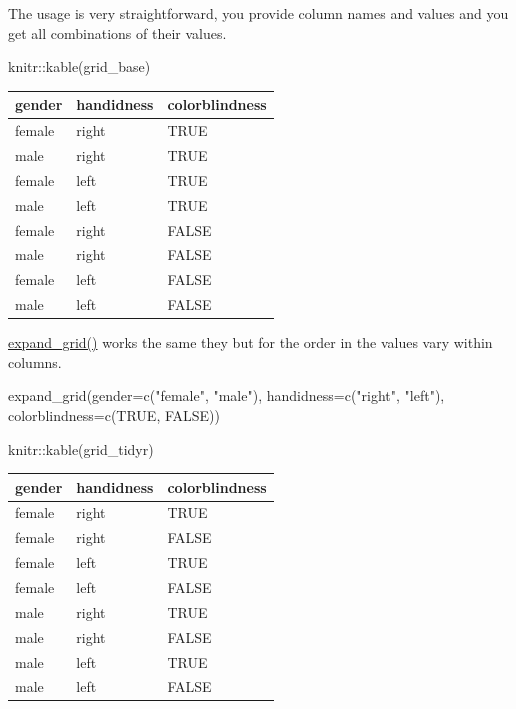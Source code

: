 \documentclass[
]{book}
\newenvironment{Shaded}{\begin{snugshade}}{\end{snugshade}}
\newcommand{\AttributeTok}[1]{\textcolor[rgb]{0.77,0.63,0.00}{#1}}
\newcommand{\ConstantTok}[1]{\textcolor[rgb]{0.00,0.00,0.00}{#1}}
\newcommand{\FunctionTok}[1]{\textcolor[rgb]{0.00,0.00,0.00}{#1}}
\newcommand{\NormalTok}[1]{#1}
\newcommand{\SpecialCharTok}[1]{\textcolor[rgb]{0.00,0.00,0.00}{#1}}
\newcommand{\StringTok}[1]{\textcolor[rgb]{0.31,0.60,0.02}{#1}}
\begin{document}
The usage is very straightforward, you provide column names and values and you get all combinations of their values.

\begin{Shaded}
\begin{Highlighting}[]
\NormalTok{knitr}\SpecialCharTok{::}\FunctionTok{kable}\NormalTok{(grid\_base)}
\end{Highlighting}
\end{Shaded}

\begin{tabular}{l|l|l}
\hline
gender & handidness & colorblindness\\
\hline
female & right & TRUE\\
\hline
male & right & TRUE\\
\hline
female & left & TRUE\\
\hline
male & left & TRUE\\
\hline
female & right & FALSE\\
\hline
male & right & FALSE\\
\hline
female & left & FALSE\\
\hline
male & left & FALSE\\
\hline
\end{tabular}

\href{https://tidyr.tidyverse.org/reference/expand_grid.html}{expand\_grid()} works the same they but for the order in the values vary within columns.

\begin{Shaded}
\begin{Highlighting}[]
\FunctionTok{expand\_grid}\NormalTok{(}\AttributeTok{gender=}\FunctionTok{c}\NormalTok{(}\StringTok{"female"}\NormalTok{, }\StringTok{"male"}\NormalTok{), }
            \AttributeTok{handidness=}\FunctionTok{c}\NormalTok{(}\StringTok{"right"}\NormalTok{, }\StringTok{"left"}\NormalTok{),}
            \AttributeTok{colorblindness=}\FunctionTok{c}\NormalTok{(}\ConstantTok{TRUE}\NormalTok{, }\ConstantTok{FALSE}\NormalTok{))}
\end{Highlighting}
\end{Shaded}

\begin{Shaded}
\begin{Highlighting}[]
\NormalTok{knitr}\SpecialCharTok{::}\FunctionTok{kable}\NormalTok{(grid\_tidyr)}
\end{Highlighting}
\end{Shaded}

\begin{tabular}{l|l|l}
\hline
gender & handidness & colorblindness\\
\hline
female & right & TRUE\\
\hline
female & right & FALSE\\
\hline
female & left & TRUE\\
\hline
female & left & FALSE\\
\hline
male & right & TRUE\\
\hline
male & right & FALSE\\
\hline
male & left & TRUE\\
\hline
male & left & FALSE\\
\hline
\end{tabular}
\end{document}
